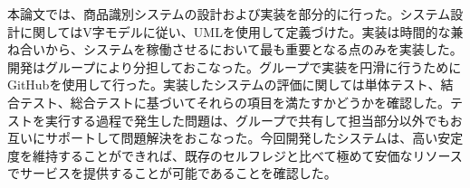 本論文では、商品識別システムの設計および実装を部分的に行った。システム設計に関してはV字モデルに従い、UMLを使用して定義づけた。実装は時間的な兼ね合いから、システムを稼働させるにおいて最も重要となる点のみを実装した。開発はグループにより分担しておこなった。グループで実装を円滑に行うためにGitHubを使用して行った。実装したシステムの評価に関しては単体テスト、結合テスト、総合テストに基づいてそれらの項目を満たすかどうかを確認した。テストを実行する過程で発生した問題は、グループで共有して担当部分以外でもお互いにサポートして問題解決をおこなった。今回開発したシステムは、高い安定度を維持することができれば、既存のセルフレジと比べて極めて安価なリソースでサービスを提供することが可能であることを確認した。